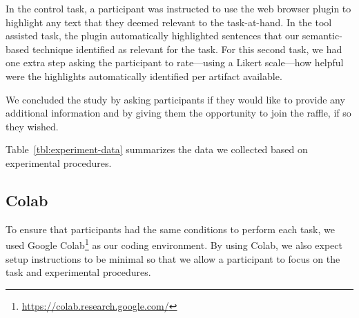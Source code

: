 {In the control task, a participant was instructed to use the web browser plugin to highlight any text that they deemed relevant to the task-at-hand. 
In the tool assisted task, the plugin automatically highlighted sentences that our semantic-based technique identified as relevant for the task. 
For this second task, we had one extra step asking the participant to rate---using a Likert scale---how helpful were the highlights automatically identified per artifact available. 


We concluded the study by asking participants if they would like to provide any additional information and 
by giving them the opportunity to join the raffle, if so they wished. 









Table~\ref{tbl:experiment-data} summarizes the data we collected based on experimental procedures.




\subsection{Colab}
\label{cp6:environment}


To ensure that participants had the same conditions to perform each task, we used Google Colab\footnote{\url{https://colab.research.google.com/}} as our coding environment. 
By using Colab, we also expect setup instructions to be minimal 
so that we allow a participant to focus on the task and experimental procedures.



}
